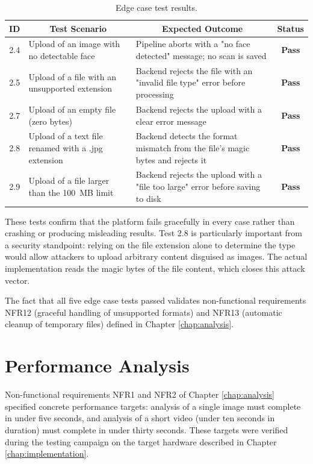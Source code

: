 \begin{table}[H]
\centering
\renewcommand{\arraystretch}{1.3}
\begin{tabular}{|c|p{5.8cm}|p{5.8cm}|c|}
\hline
\textbf{ID} & \multicolumn{1}{c|}{\textbf{Test Scenario}} & \multicolumn{1}{c|}{\textbf{Expected Outcome}} & \textbf{Status} \\
\hline
2.4 & Upload of an image with no detectable face & Pipeline aborts with a "no face detected" message; no scan is saved & \textbf{Pass} \\
\hline
2.5 & Upload of a file with an unsupported extension & Backend rejects the file with an "invalid file type" error before processing & \textbf{Pass} \\
\hline
2.7 & Upload of an empty file (zero bytes) & Backend rejects the upload with a clear error message & \textbf{Pass} \\
\hline
2.8 & Upload of a text file renamed with a .jpg extension & Backend detects the format mismatch from the file's magic bytes and rejects it & \textbf{Pass} \\
\hline
2.9 & Upload of a file larger than the 100~MB limit & Backend rejects the upload with a "file too large" error before saving to disk & \textbf{Pass} \\
\hline
\end{tabular}
\caption{Edge case test results.}
\label{tab:test-edge}
\end{table}

These tests confirm that the platform fails gracefully in every case rather than crashing or producing misleading results. Test 2.8 is particularly important from a security standpoint: relying on the file extension alone to determine the type would allow attackers to upload arbitrary content disguised as images. The actual implementation reads the magic bytes of the file content, which closes this attack vector.

The fact that all five edge case tests passed validates non-functional requirements NFR12 (graceful handling of unsupported formats) and NFR13 (automatic cleanup of temporary files) defined in Chapter \ref{chap:analysis}.

\section{Performance Analysis}

Non-functional requirements NFR1 and NFR2 of Chapter \ref{chap:analysis} specified concrete performance targets: analysis of a single image must complete in under five seconds, and analysis of a short video (under ten seconds in duration) must complete in under thirty seconds. These targets were verified during the testing campaign on the target hardware described in Chapter \ref{chap:implementation}.

